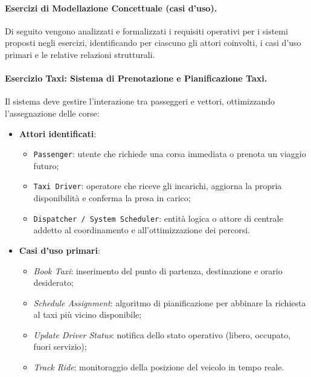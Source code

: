 \documentclass[12pt]{extarticle}
\begin{document}
\paragraph{Esercizi di Modellazione Concettuale (casi d'uso).}
Di seguito vengono analizzati e formalizzati i requisiti operativi per i sistemi proposti negli esercizi, identificando per ciascuno gli attori coinvolti, i casi d'uso primari e le relative relazioni strutturali.

\paragraph{Esercizio Taxi: Sistema di Prenotazione e Pianificazione Taxi.}
Il sistema deve gestire l'interazione tra passeggeri e vettori, ottimizzando l'assegnazione delle corse:
\begin{itemize}
    \item \textbf{Attori identificati}:
    \begin{itemize}
        \item \texttt{Passenger}: utente che richiede una corsa immediata o prenota un viaggio futuro;
        \item \texttt{Taxi Driver}: operatore che riceve gli incarichi, aggiorna la propria disponibilità e conferma la presa in carico;
        \item \texttt{Dispatcher / System Scheduler}: entità logica o attore di centrale addetto al coordinamento e all'ottimizzazione dei percorsi.
    \end{itemize}
    \item \textbf{Casi d'uso primari}:
    \begin{itemize}
        \item \textit{Book Taxi}: inserimento del punto di partenza, destinazione e orario desiderato;
        \item \textit{Schedule Assignment}: algoritmo di pianificazione per abbinare la richiesta al taxi più vicino disponibile;
        \item \textit{Update Driver Status}: notifica dello stato operativo (libero, occupato, fuori servizio);
        \item \textit{Track Ride}: monitoraggio della posizione del veicolo in tempo reale.
    \end{itemize}
\end{itemize}
\end{document}
